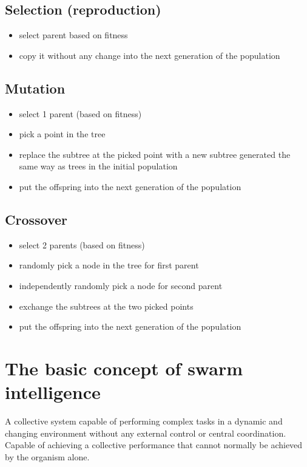 \documentclass[a4paper,12pt,answers]{article}
\begin{document}
	\subsection{Selection (reproduction)}
	\begin{itemize}
		\item select parent based on fitness
		\item copy it without any change into the next generation of the population
	\end{itemize}
	
	 
	\subsection{Mutation}
	\begin{itemize}
		\item select 1 parent (based on fitness)
		\item pick a point in the tree
		\item replace the subtree at the picked point with a new subtree generated the same way as trees in the initial population
		\item put the offspring into the next generation of the population 
	\end{itemize}
	
	
	\subsection{Crossover}
	\begin{itemize}
		\item select 2 parents (based on fitness)
		\item randomly pick a node in the tree for first parent
		\item independently randomly pick a node for second parent
		\item exchange the subtrees at the two picked points
		\item put the offspring into the next generation of the population
	\end{itemize}
	
	
	
	\newpage
	\section{The basic concept of swarm intelligence}
	A collective system capable of performing complex tasks in a dynamic and changing environment without any external control or central coordination. Capable of achieving a collective performance that cannot normally be achieved by the organism alone.
\end{document}
